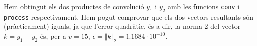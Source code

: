 \documentclass[11pt,a4]{article}
\numberwithin{equation}{section}
\theoremstyle{thmstyle}
\theoremstyle{thmstyle}
\theoremstyle{thmstyle}
\theoremstyle{thmstyle}
\theoremstyle{thmstyle}
\theoremstyle{thmstyle}
\theoremstyle{thmstyle}
\begin{document}
Hem obtingut els dos productes de convolució $y_1$ i $y_2$ amb les funcions {\tt conv} i {\tt process} respectivament. Hem pogut comprovar que els dos vectors resultants són (pràcticament) iguals, ja que l'error quadràtic, és a dir, la norma 2 del vector $k = y_1 - y_2$ és, per a $v=15$, $\epsilon = \Vert k \Vert_2 = 1.1684 \cdot 10^{-10}$.
\end{document}
